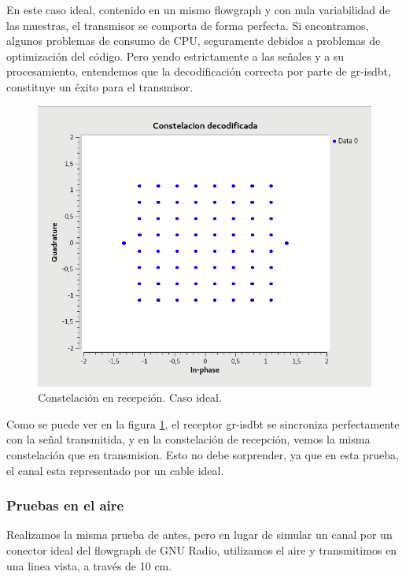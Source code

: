 En este caso ideal, contenido en un mismo flowgraph y con nula variabilidad de las muestras, el transmisor se comporta de forma perfecta. Si encontramos, algunos problemas de consumo de CPU, seguramente debidos a problemas de optimización del código. 
Pero yendo estrictamente a las señales y a su procesamiento, entendemos que la decodificación correcta por parte de gr-isdbt, constituye un éxito para el transmisor. 

\begin{figure}[!h]
	\centering
	\includegraphics[scale=0.5]{figuras/cap06/const_rec}
	\caption{\label{f:const_rec} Constelación en recepción. Caso ideal.}
\end{figure}

Como se puede ver en la figura \ref{f:const_rec}, el receptor gr-isdbt se sincroniza perfectamente con la señal transmitida, y en la constelación de recepción, vemos la misma constelación que en transmision. Esto no debe sorprender, ya que en esta prueba, el canal esta representado por un cable ideal. 

\subsubsection{Pruebas en el aire}

Realizamos la misma prueba de antes, pero en lugar de simular un canal por un conector ideal del flowgraph de GNU Radio, utilizamos el aire y transmitimos en una linea vista, a través de 10 cm. 

